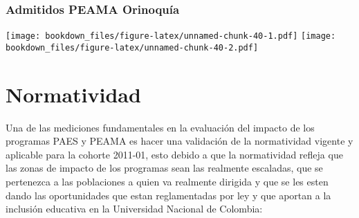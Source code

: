 \documentclass[]{article}
\theoremstyle{definition}
\theoremstyle{definition}
\theoremstyle{definition}
\theoremstyle{remark}
\begin{document}
\subsubsection{Admitidos PEAMA
Orinoquía}\label{admitidos-peama-orinoquia-1}

\texttt{[image: bookdown\_files/figure-latex/unnamed-chunk-40-1.pdf]}
\texttt{[image: bookdown\_files/figure-latex/unnamed-chunk-40-2.pdf]}

\section{Normatividad}\label{normatividad}

Una de las mediciones fundamentales en la evaluación del impacto de los
programas PAES y PEAMA es hacer una validación de la normatividad
vigente y aplicable para la cohorte 2011-01, esto debido a que la
normatividad refleja que las zonas de impacto de los programas sean las
realmente escaladas, que se pertenezca a las poblaciones a quien va
realmente dirigida y que se les esten dando las oportunidades que estan
reglamentadas por ley y que aportan a la inclusión educativa en la
Universidad Nacional de Colombia:
\end{document}

